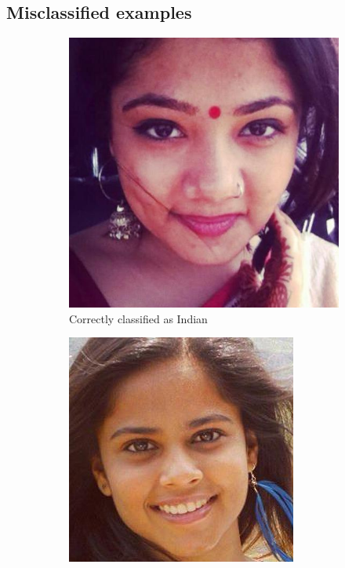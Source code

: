 \subsection{Misclassified examples}
\begin{figure}
    \centering
    \begin{subfigure}[b]{0.3\textwidth}
      \includegraphics[width=\textwidth]{figures/results/misclassification/india-india.jpg}
      \caption{Correctly classified as Indian}
    \end{subfigure}
    \begin{subfigure}[b]{0.3\textwidth}
      \includegraphics[width=\textwidth]{figures/results/misclassification/india-brazil.jpg}

\end{subfigure}
\end{figure}
